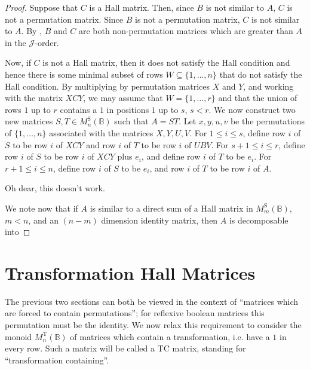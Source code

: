 \documentclass[11pt]{article}
\numberwithin{equation}{section}
\newcommand{\B}{\mathbb{B}}
\newcommand{\Halln}{M_n^{\text{S}}(\B)}
\newcommand{\Hall}[1]{M_{#1}^{\text{S}}(\B)}
\newcommand{\MTn}{M_n^{\text{T}}(\B)}
\newcommand{\J}{\mathscr{J}}
\begin{document}
\begin{proof}
  Suppose that $C$ is a Hall matrix. Then, since $B$ is not similar to $A$, $C$
  is not a permutation matrix.  Since $B$ is not a permutation matrix, $C$ is
  not similar to $A$. By , $B$ and $C$ are both
  non-permutation matrices which are greater than $A$ in the $\J$-order.

  Now, if $C$ is not a Hall matrix, then it does not satisfy the Hall condition
  and hence there is some minimal subset of rows $W \subseteq \{1, \ldots, n \}$
  that do not satisfy the Hall condition. By multiplying by permutation matrices
  $X$ and $Y$, and working with the matrix $XCY$, we may assume that $W = \{1,
    \ldots, r \}$ and that the union of rows $1$ up to $r$ contains a $1$ in
  positions $1$ up to $s$, $s < r$. We now construct two new matrices $S, T \in
  \Halln$ such that $A = ST$. 
  Let $x, y, u, v$ be the permutations of $\{1, \ldots, n \}$ associated with
  the matrices $X, Y, U, V$. For $1 \leq i \leq s$, define row $i$ of $S$ to
  be row $i$ of $XCY$ and row $i$ of $T$ to be row $i$ of $UBV$. For $s + 1 \leq
  i \leq r$, define row $i$ of $S$ to be row $i$ of $XCY$ plus $e_i$, and define
  row $i$ of $T$ to be $e_i$. For $r + 1 \leq i \leq n$, define row $i$ of $S$
  to be $e_i$, and row $i$ of $T$ to be row $i$ of $A$. 
  
  
  Oh dear, this doesn't work.
 

  We note now
  that if $A$ is similar to a direct sum of a Hall matrix in $\Hall{m}$, $m <
  n$, and an $(n-m)$ dimension identity matrix, then $A$ is decomposable into 

\end{proof}

\section{Transformation Hall Matrices}
The previous two sections can both be viewed in the context of ``matrices which
are forced to contain permutations''; for reflexive boolean matrices this
permutation must be the identity. We now relax this requirement to consider the
monoid $\MTn$ of matrices which contain a transformation, i.e. have a $1$ in
every row. Such a matrix will be called a TC matrix, standing for
``transformation containing''.
\end{document}
